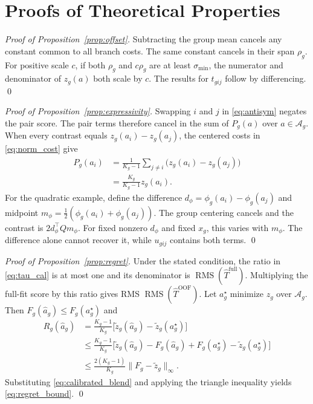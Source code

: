\documentclass[letterpaper,journal]{IEEEtran}
\DeclareMathOperator{\RMS}{RMS}
\begin{document}
\appendices
\section{Proofs of Theoretical Properties}
\label{app:proofs}

\emph{Proof of Proposition~\ref{prop:offset}.}
Subtracting the group mean cancels any constant common to all branch costs. The same constant cancels in their span $\rho_g$. For positive scale $c$, if both $\rho_g$ and $c\rho_g$ are at least $\sigma_{\min}$, the numerator and denominator of $z_g(a)$ both scale by $c$. The results for $t_{gij}$ follow by differencing. \qed

\emph{Proof of Proposition~\ref{prop:expressivity}.}
Swapping $i$ and $j$ in \eqref{eq:antisym} negates the pair score. The pair terms therefore cancel in the sum of $P_g(a)$ over $a\in\mathcal{A}_g$. When every contrast equals $z_g(a_i)-z_g(a_j)$, the centered costs in \eqref{eq:norm_cost} give
\begin{align*}
  P_g(a_i)&=\frac{1}{K_g-1}\sum_{j\ne i}\bigl(z_g(a_i)-z_g(a_j)\bigr)\\
  &=\frac{K_g}{K_g-1}z_g(a_i).
\end{align*}
For the quadratic example, define the difference $d_\phi=\phi_g(a_i)-\phi_g(a_j)$ and midpoint $m_\phi=\tfrac12(\phi_g(a_i)+\phi_g(a_j))$. The group centering cancels and the contrast is $2d_\phi^\top Qm_\phi$. For fixed nonzero $d_\phi$ and fixed $x_g$, this varies with $m_\phi$. The difference alone cannot recover it, while $u_{gij}$ contains both terms. \qed

\emph{Proof of Proposition~\ref{prop:regret}.}
Under the stated condition, the ratio in \eqref{eq:tau_cal} is at most one and its denominator is $\RMS(\widehat T^{\mathrm{full}})$. Multiplying the full-fit score by this ratio gives RMS $\RMS(\widehat T^{\mathrm{OOF}})$. Let $a_g^\star$ minimize $z_g$ over $\mathcal{A}_g$. Then $F_g(\widehat a_g)\le F_g(a_g^\star)$ and
\begin{align*}
  R_g(\widehat a_g)
  &=\frac{K_g-1}{K_g}\bigl[\tilde z_g(\widehat a_g)-\tilde z_g(a_g^\star)\bigr]\\
  &\le\frac{K_g-1}{K_g}\bigl[\tilde z_g(\widehat a_g)-F_g(\widehat a_g)
             +F_g(a_g^\star)-\tilde z_g(a_g^\star)\bigr]\\
  &\le\frac{2(K_g-1)}{K_g}\|F_g-\tilde z_g\|_\infty.
\end{align*}
Substituting \eqref{eq:calibrated_blend} and applying the triangle inequality yields \eqref{eq:regret_bound}. \qed
\end{document}
